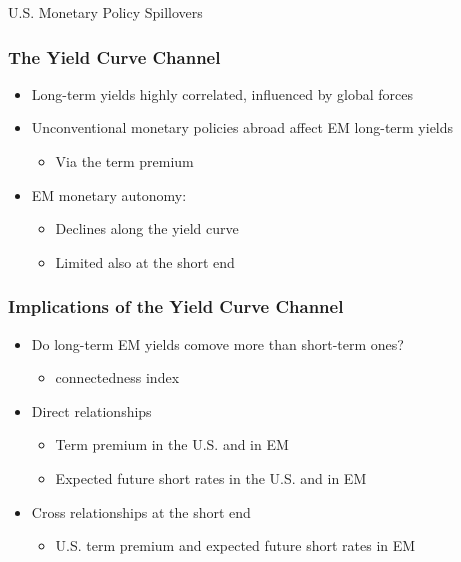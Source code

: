 \documentclass[12pt, aspectratio=169, xcolor=dvipsnames]{beamer}  %
\begin{document}
\begin{frame}
	\begin{center}
		\huge \textcolor{yaleblue}{U.S. Monetary Policy Spillovers}
	\end{center}
\end{frame}

\begin{frame}
	\frametitle{The Yield Curve Channel}
	\begin{itemize}
		\item Long-term yields highly correlated, influenced by global forces
		\item Unconventional monetary policies abroad affect EM long-term yields
		\begin{itemize}
			\item Via the term premium \citep{Turner:2014}
		\end{itemize}
		\item EM monetary autonomy:
		\begin{itemize}
			\item Declines along the yield curve \citep{Obstfeld:2015}
			\item Limited also at the short end \citep{Kalemli-Ozcan:2019}
		\end{itemize}
	\end{itemize}
\end{frame}

\begin{frame}
\frametitle{Implications of the Yield Curve Channel}
\begin{itemize}
	\item Do long-term EM yields comove more than short-term ones?
	\begin{itemize}
		\item \cite{DieboldYilmaz:2014} connectedness index
	\end{itemize}
	\item Direct relationships
	\begin{itemize}
		\item Term premium in the U.S. and in EM
		\item Expected future short rates in the U.S. and in EM
	\end{itemize}
	\item Cross relationships at the short end
	\begin{itemize}
		\item U.S. term premium and expected future short rates in EM
	\end{itemize}
\end{itemize}
\end{frame}
\end{document}
